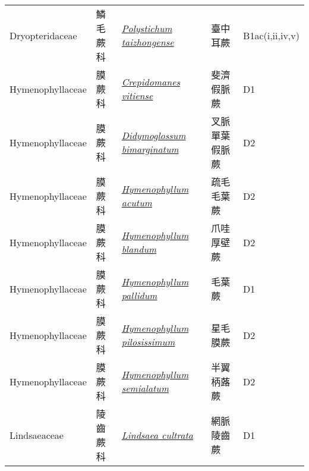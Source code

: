 {\begin{longtable}{p{2.5cm}p{2.5cm}p{4.5cm}p{2.5cm}p{3cm}}
    Dryopteridaceae & 鱗毛蕨科 & \href{http://www.theplantlist.org/tpl1.1/search?q=Polystichum+taizhongense}{\textit{Polystichum taizhongense} } & 臺中耳蕨 & B1ac(i,ii,iv,v) \index{Polystichum@\textit{Polystichum}!taizhongense@\textit{taizhongense}}  \index{臺中耳蕨} \\
    Hymenophyllaceae & 膜蕨科 & \href{http://www.theplantlist.org/tpl1.1/search?q=Crepidomanes+vitiense}{\textit{Crepidomanes vitiense} } & 斐濟假脈蕨 & D1 \index{Crepidomanes@\textit{Crepidomanes}!vitiense@\textit{vitiense}}  \index{斐濟假脈蕨} \\
    Hymenophyllaceae & 膜蕨科 & \href{http://www.theplantlist.org/tpl1.1/search?q=Didymoglossum+bimarginatum}{\textit{Didymoglossum bimarginatum} } & 叉脈單葉假脈蕨 & D2 \index{Didymoglossum@\textit{Didymoglossum}!bimarginatum@\textit{bimarginatum}}  \index{叉脈單葉假脈蕨} \\
    Hymenophyllaceae & 膜蕨科 & \href{http://www.theplantlist.org/tpl1.1/search?q=Hymenophyllum+acutum}{\textit{Hymenophyllum acutum} } & 疏毛毛葉蕨 & D2 \index{Hymenophyllum@\textit{Hymenophyllum}!acutum@\textit{acutum}}  \index{疏毛毛葉蕨} \\
    Hymenophyllaceae & 膜蕨科 & \href{http://www.theplantlist.org/tpl1.1/search?q=Hymenophyllum+blandum}{\textit{Hymenophyllum blandum} } & 爪哇厚壁蕨 & D2 \index{Hymenophyllum@\textit{Hymenophyllum}!blandum@\textit{blandum}}  \index{爪哇厚壁蕨} \\
    Hymenophyllaceae & 膜蕨科 & \href{http://www.theplantlist.org/tpl1.1/search?q=Hymenophyllum+pallidum}{\textit{Hymenophyllum pallidum} } & 毛葉蕨 & D1 \index{Hymenophyllum@\textit{Hymenophyllum}!pallidum@\textit{pallidum}}  \index{毛葉蕨} \\
    Hymenophyllaceae & 膜蕨科 & \href{http://www.theplantlist.org/tpl1.1/search?q=Hymenophyllum+pilosissimum}{\textit{Hymenophyllum pilosissimum} } & 星毛膜蕨 & D2 \index{Hymenophyllum@\textit{Hymenophyllum}!pilosissimum@\textit{pilosissimum}}  \index{星毛膜蕨} \\
    Hymenophyllaceae & 膜蕨科 & \href{http://www.theplantlist.org/tpl1.1/search?q=Hymenophyllum+semialatum}{\textit{Hymenophyllum semialatum} } & 半翼柄蕗蕨 & D2 \index{Hymenophyllum@\textit{Hymenophyllum}!semialatum@\textit{semialatum}}  \index{半翼柄蕗蕨} \\
    Lindsaeaceae & 陵齒蕨科 & \href{http://www.theplantlist.org/tpl1.1/search?q=Lindsaea+cultrata}{\textit{Lindsaea cultrata} } & 網脈陵齒蕨 & D1 \index{Lindsaea@\textit{Lindsaea}!cultrata@\textit{cultrata}}  \index{網脈陵齒蕨} \\

\end{longtable}}
